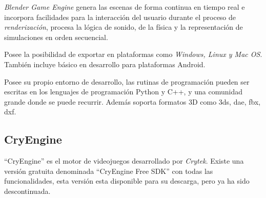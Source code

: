 \textit{Blender Game Engine} genera las escenas de forma continua en tiempo real
e incorpora facilidades para la interacción del usuario durante el proceso de
\textit{renderización}, procesa la lógica de sonido, de la física y la 
representación de simulaciones en orden secuencial\cite{blender}.

Posee la posibilidad de exportar en plataformas como
\textit{Windows, Linux y Mac OS}. También incluye básico en desarrollo para 
plataformas Android\cite{blender}.

Posee su propio entorno de desarrollo, las rutinas de programación pueden ser 
escritas en los lenguajes de programación Python y C++, y
una comunidad grande donde se puede recurrir. Además soporta formatos 3D 
como 3ds, dae, fbx, dxf\cite{blender}.





\subsection{CryEngine}


\enquote{CryEngine} es el motor de videojuegos desarrollado por \textit{Crytek}. Existe 
una versión gratuita denominada \enquote{CryEngine Free SDK} con todas las 
funcionalidades, esta versión esta disponible para su descarga, pero ya ha sido descontinuada\cite{cryengine:sdk}.

